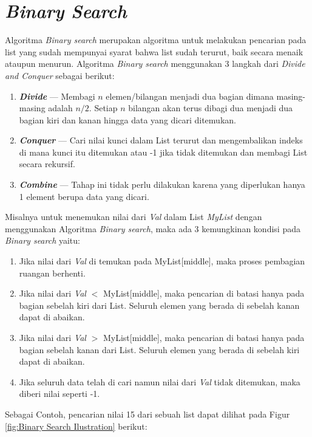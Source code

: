 \section{\textit{Binary Search}}
Algoritma \textit{Binary search}  merupakan  algoritma untuk melakukan pencarian pada list yang sudah mempunyai syarat bahwa list sudah terurut, baik secara menaik ataupun menurun. Algoritma \textit{Binary search} menggunakan 3 langkah dari \textit{Divide and Conquer} sebagai berikut:
\begin{enumerate}
\item \textbf{\textit{Divide}} --- Membagi $n$ elemen/bilangan menjadi dua bagian dimana masing-masing adalah $n/2$. Setiap $n$ bilangan akan terus dibagi dua menjadi dua bagian kiri dan kanan hingga data yang dicari ditemukan.
\item \textbf{\textit{Conquer}} --- Cari nilai kunci dalam  List terurut dan mengembalikan indeks di mana kunci itu ditemukan atau -1 jika tidak ditemukan dan membagi List secara rekursif.
\item \textbf{\textit{Combine}} --- Tahap ini tidak perlu dilakukan karena yang diperlukan hanya 1 element berupa data yang dicari.
\end{enumerate}

 Misalnya untuk menemukan nilai dari \textit{Val}  dalam List \textit{MyList} dengan menggunakan Algoritma \textit{Binary search}, maka ada 3 kemungkinan kondisi pada \textit{Binary search} yaitu:
\begin{enumerate}
  \item Jika nilai dari \textit{Val} di temukan pada MyList[middle], maka proses pembagian ruangan berhenti. 
  \item Jika nilai dari \textit{Val} $<$ MyList[middle], maka pencarian di batasi hanya pada bagian sebelah kiri dari List. Seluruh elemen yang berada di sebelah kanan dapat di abaikan.
  \item Jika nilai dari \textit{Val} $>$ MyList[middle], maka pencarian di batasi hanya pada bagian sebelah kanan dari List. Seluruh elemen yang berada di sebelah kiri dapat di abaikan.
  \item Jika seluruh data telah di cari namun nilai dari \textit{Val} tidak ditemukan, maka diberi nilai seperti -1.
\end{enumerate}

Sebagai Contoh, pencarian nilai 15 dari sebuah list dapat dilihat pada Figur \ref{fig:Binary Search Ilustration} berikut:

